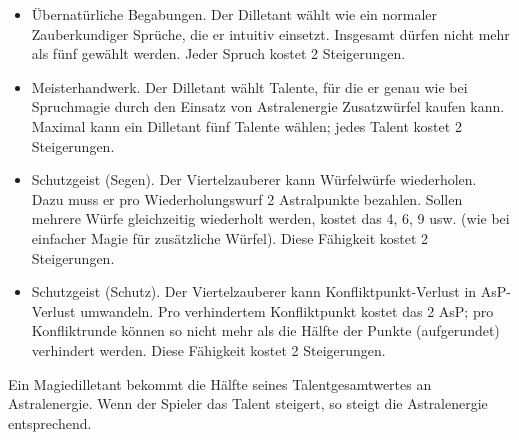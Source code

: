 \begin{itemize}
\item Übernatürliche Begabungen. Der Dilletant wählt wie ein normaler Zauberkundiger Sprüche, die er intuitiv einsetzt. Insgesamt dürfen nicht mehr als fünf gewählt werden. Jeder Spruch kostet 2 Steigerungen.
\item Meisterhandwerk. Der Dilletant wählt Talente, für die er genau wie bei Spruchmagie durch den Einsatz von Astralenergie Zusatzwürfel kaufen kann. Maximal kann ein Dilletant fünf Talente wählen; jedes Talent kostet 2 Steigerungen.
\item Schutzgeist (Segen). Der Viertelzauberer kann Würfelwürfe wiederholen. Dazu muss er pro Wiederholungswurf 2 Astralpunkte bezahlen. Sollen mehrere Würfe gleichzeitig wiederholt werden, kostet das 4, 6, 9 usw. (wie bei einfacher Magie für zusätzliche Würfel). Diese Fähigkeit kostet 2 Steigerungen.
\item Schutzgeist (Schutz). Der Viertelzauberer kann Konfliktpunkt-Verlust in AsP-Verlust umwandeln. Pro verhindertem Konfliktpunkt kostet das 2 AsP; pro Konfliktrunde können so nicht mehr als die Hälfte der Punkte (aufgerundet) verhindert werden. Diese Fähigkeit kostet 2 Steigerungen.
\end{itemize}

Ein Magiedilletant bekommt die Hälfte seines Talentgesamtwertes an Astralenergie. Wenn der Spieler das Talent steigert, so steigt die Astralenergie entsprechend.
\EN


